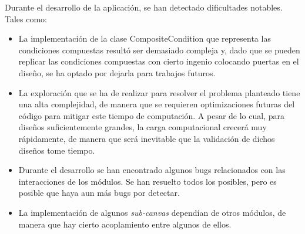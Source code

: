 Durante el desarrollo de la aplicación, se han detectado dificultades notables. Tales como:
\begin{itemize}
	\item La implementación de la clase CompositeCondition que representa las condiciones compuestas resultó ser demasiado compleja y, dado que se pueden replicar las condiciones compuestas con cierto ingenio colocando puertas en el diseño, se ha optado por dejarla para trabajos futuros.
	\item La exploración que se ha de realizar para resolver el problema planteado tiene una alta complejidad, de manera que se requieren optimizaciones futuras del código para mitigar este tiempo de computación. A pesar de lo cual, para diseños suficientemente grandes, la carga computacional crecerá muy rápidamente, de manera que será inevitable que la validación de dichos diseños tome tiempo.
	\item Durante el desarrollo se han encontrado algunos bugs relacionados con las interacciones de los módulos. Se han resuelto todos los posibles, pero es posible que haya aun más bugs por detectar.
	\item La implementación de algunos \textit{sub-canvas} dependían de otros módulos, de manera que hay cierto acoplamiento entre algunos de ellos.
\end{itemize}